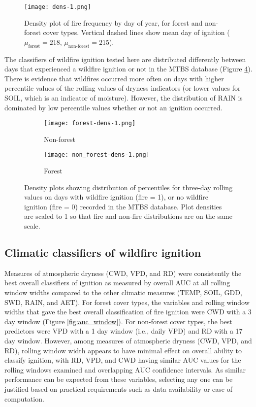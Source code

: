 \documentclass[11p]{article}
\begin{document}
\begin{figure}[htbp]
  \texttt{[image: dens-1.png]}
  \caption{Density plot of fire frequency by day of year, for forest and non-forest cover types. Vertical dashed lines show mean day of ignition ($\mu_{\text{forest}} = 218$, $\mu_{\text{non-forest}} = 215$).}
  \label{fig:fire-dens}
\end{figure}

The classifiers of wildfire ignition tested here are distributed differently between days that experienced a wildfire ignition or not in the MTBS database (Figure \ref{fig:dens}). There is evidence that wildfires occurred more often on days with higher percentile values of the rolling values of dryness indicators (or lower values for SOIL, which is an indicator of moisture). However, the distribution of RAIN is dominated by low percentile values whether or not an ignition occurred.  

\begin{figure}[htbp]
  \centering
  \begin{subfigure}{.5\textwidth}
    \centering
    \texttt{[image: forest-dens-1.png]}
    \caption{Non-forest}
    \label{fig:dens-nf}
  \end{subfigure}%
  \begin{subfigure}{.5\textwidth}
    \centering
    \texttt{[image: non\_forest-dens-1.png]}
    \caption{Forest}
    \label{fig:dens-f}
  \end{subfigure}
  \caption{Density plots showing distribution of percentiles for three-day rolling values on days with wildfire ignition (fire = 1), or no wildfire ignition (fire = 0) recorded in the MTBS database. Plot densities are scaled to 1 so that fire and non-fire distributions are on the same scale.}
  \label{fig:dens}
\end{figure}

\subsection{Climatic classifiers of wildfire ignition}

Measures of atmospheric dryness (CWD, VPD, and RD) were consistently the best overall classifiers of ignition as measured by overall AUC at all rolling window widths compared to the other climatic measures (TEMP, SOIL, GDD, SWD, RAIN, and AET). For forest cover types, the variables and rolling window widths that gave the best overall classification of fire ignition were CWD with a 3 day window (Figure \ref{fig:auc_window}). For non-forest cover types, the best predictors were VPD with a 1 day window (i.e., daily VPD) and RD with a 17 day window. However, among measures of atmospheric dryness (CWD, VPD, and RD), rolling window width appears to have minimal effect on overall ability to classify ignition, with RD, VPD, and CWD having similar AUC values for the rolling windows examined and overlapping AUC confidence intervals. As similar performance can be expected from these variables, selecting any one can be justified based on practical requirements such as data availability or ease of computation.
\end{document}
